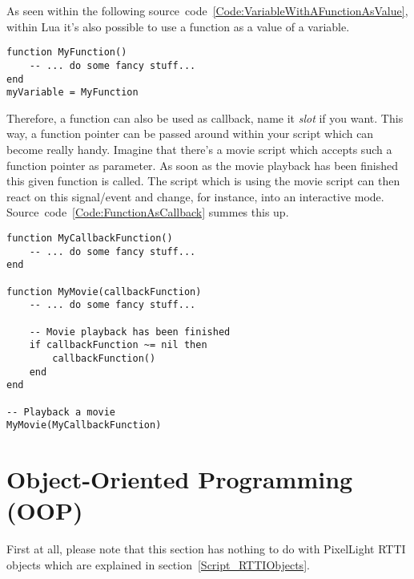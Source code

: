 As seen within the following source~code~\ref{Code:VariableWithAFunctionAsValue}, within Lua it's also possible to use a function as a value of a variable.
\begin{lstlisting}[float=htb,label=Code:VariableWithAFunctionAsValue,caption={Variable with a function as value}]
function MyFunction()
	-- ... do some fancy stuff...
end
myVariable = MyFunction
\end{lstlisting}
Therefore, a function can also be used as callback, name it \emph{slot} if you want. This way, a function pointer can be passed around within your script which can become really handy. Imagine that there's a movie script which accepts such a function pointer as parameter. As soon as the movie playback has been finished this given function is called. The script which is using the movie script can then react on this signal/event and change, for instance, into an interactive mode. Source~code~\ref{Code:FunctionAsCallback} summes this up.
\begin{lstlisting}[float=htb,label=Code:FunctionAsCallback,caption={Function as callback}]
function MyCallbackFunction()
	-- ... do some fancy stuff...
end

function MyMovie(callbackFunction)
	-- ... do some fancy stuff...

	-- Movie playback has been finished
	if callbackFunction ~= nil then
		callbackFunction()
	end
end

-- Playback a movie
MyMovie(MyCallbackFunction)
\end{lstlisting}




\section{Object-Oriented Programming (OOP)}
First at all, please note that this section has nothing to do with PixelLight \ac{RTTI} objects which are explained in section~\ref{Script_RTTIObjects}.

